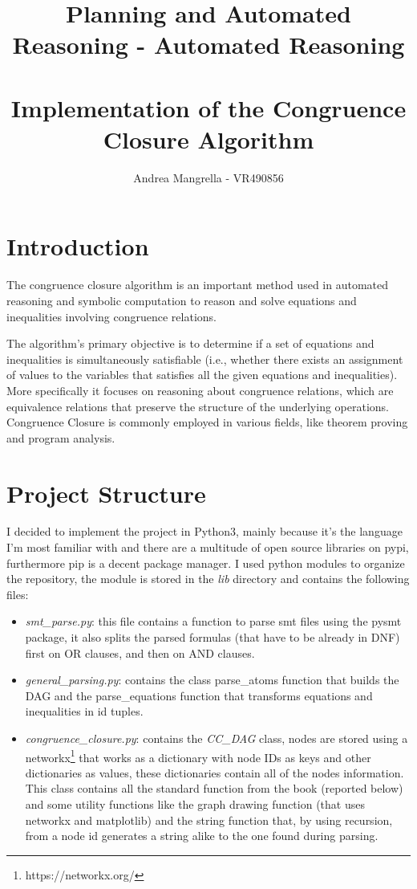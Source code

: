 \documentclass[a4paper]{article}
\title{%
    \textbf{Planning and Automated Reasoning - Automated Reasoning} \\ 
    \large \textbf{ \\ Implementation of the Congruence Closure Algorithm}}
\author{Andrea Mangrella - VR490856}
\begin{document}
\maketitle
\section{Introduction}
The congruence closure algorithm is an important method used in automated reasoning and symbolic computation to reason and solve equations and inequalities involving congruence relations. 

\noindent
The algorithm's primary objective is to determine if a set of equations and inequalities is simultaneously satisfiable (i.e., whether there exists an assignment of values to the variables that satisfies all the given equations and inequalities). More specifically it focuses on reasoning about congruence relations, which are equivalence relations that preserve the structure of the underlying operations. Congruence Closure is commonly employed in various fields, like theorem proving and program analysis.

\section{Project Structure}
I decided to implement the project in Python3, mainly because it's the language I'm most familiar with and there are a multitude of open source libraries on pypi, furthermore pip is a decent package manager.
I used python modules to organize the repository, the module is stored in the \textit{lib} directory and contains the following files:
\begin{itemize}
    \item  \textit{smt\_parse.py}: this file contains a function to parse smt files using the pysmt package, it also splits the parsed formulas (that have to be already in DNF) first on OR clauses, and then on AND clauses. 
    \item \textit{general\_parsing.py}: contains the class parse\_atoms function that builds the DAG and the parse\_equations function that transforms equations and inequalities in id tuples.
    \newpage
    \item \textit{congruence\_closure.py}: contains the \textit{CC\_DAG} class, nodes are stored using a networkx\footnote{https://networkx.org/} that works as a dictionary with node IDs as keys and other dictionaries as values, these dictionaries contain all of the nodes information. This class contains all the standard function from the book (reported below) and some utility functions like the graph drawing function (that uses networkx and matplotlib) and the string function that, by using recursion, from a node id generates a string alike to the one found during parsing. 
\end{itemize}
\end{document}
